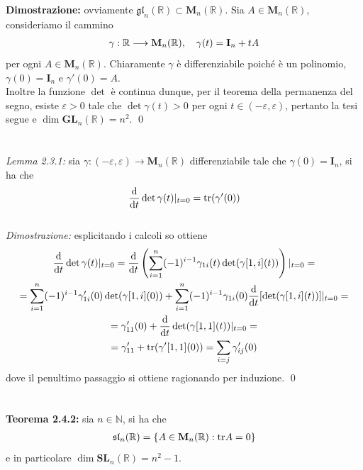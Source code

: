 \documentclass{article}
\begin{document}
\textbf{Dimostrazione:} ovviamente $\mathfrak{gl}_n(\mathbb{R}) \subset \mathbf{M}_n(\mathbb{R})$. Sia $A \in \mathbf{M}_n(\mathbb{R})$, consideriamo il cammino
\begin{gather}
    \gamma : \mathbb{R} \longrightarrow \mathbf{M}_n(\mathbb{R}), \quad \gamma(t) = \mathbf{I}_n + tA \notag
\end{gather}
per ogni $A \in \mathbf{M}_n(\mathbb{R})$. Chiaramente $\gamma$ è differenziabile poiché è un polinomio,  $\gamma(0) = \mathbf{I}_n$ e $\gamma'(0) = A$. \\
Inoltre la funzione $\det$ è continua dunque, per il teorema della permanenza del segno, esiste $\varepsilon > 0$ tale che $\det \gamma(t) > 0$ per ogni $t \in (-\varepsilon, \varepsilon)$, pertanto la tesi segue e $\dim \mathbf{GL}_n(\mathbb{R}) = n^2$. \qed \\ \\ \\
\textit{Lemma 2.3.1:} sia $\gamma : (-\varepsilon, \varepsilon) \longrightarrow \mathbf{M}_n(\mathbb{R})$ differenziabile tale che $\gamma(0) = \mathbf{I}_n$, si ha che
\begin{gather}
    \frac{\mathrm{d}}{\mathrm{d}t} \det \gamma(t) |_{t = 0} = \mathrm{tr}(\gamma'(0)) \notag
\end{gather} \\

\textit{Dimostrazione:} esplicitando i calcoli so ottiene
\begin{gather}
    \frac{\mathrm{d}}{\mathrm{d}t} \det \gamma(t)|_{t = 0} = \frac{\mathrm{d}}{\mathrm{d}t} \left( \sum_{i = 1}^n (-1)^{i - 1} \gamma_{1i}(t) \det(\gamma[1, i](t)) \right)|_{t = 0} = \notag \\
    = \sum_{i = 1}^n (-1)^{i - 1}\gamma'_{1i}(0) \det(\gamma[1,i](0)) + \sum_{i = 1}^n (-1)^{i - 1} \gamma_{1i}(0) \frac{\mathrm{d}}{\mathrm{d}t} [\det (\gamma[1, i](t))]|_{t = 0} = \notag \\
    = \gamma'_{11}(0) + \frac{\mathrm{d}}{\mathrm{d}t} \det(\gamma[1, 1](t))|_{t = 0} = \notag \\
    = \gamma'_{11} + \mathrm{tr}(\gamma'[1,1](0)) = \sum_{i = j} \gamma'_{ij}(0) \notag
\end{gather}
dove il penultimo passaggio si ottiene ragionando per induzione. \qed \\ \\ \\
\textbf{Teorema 2.4.2:} sia $n \in \mathbb{N}$, si ha che
\begin{gather}
    \mathfrak{sl}_n(\mathbb{R}) = \{ A \in \mathbf{M}_n(\mathbb{R}) : \mathrm{tr} A = 0 \} \notag
\end{gather}
e in particolare $\dim \mathbf{SL}_n(\mathbb{R}) = n^2 - 1$. \\
\end{document}
